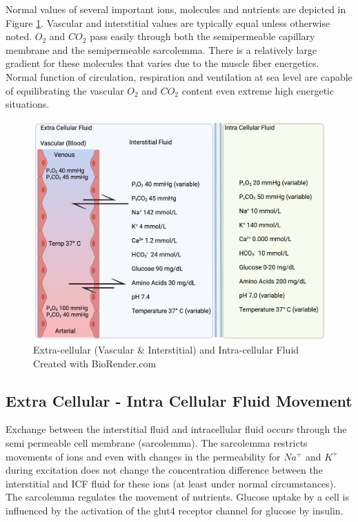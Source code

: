 Normal values of several important ions, molecules and nutrients are depicted in Figure \ref{fig:ecf}. Vascular and interstitial values are typically equal unless otherwise noted. $O_2$ and $CO_2$ pass easily through both the semipermeable capillary membrane and the semipermeable sarcolemma. There is a relatively large gradient for these molecules that varies due to the muscle fiber energetics. Normal function of circulation, respiration and ventilation at sea level are capable of equilibrating the vascular $O_2$ and $CO_2$ content even extreme high energetic situations.

\begin{figure}[!h]
    \centering
    \includegraphics[width=1\linewidth]{./figure/ecf.png}
    \caption{Extra-cellular (Vascular \& Interstitial) and Intra-cellular Fluid \footnotesize{Created with BioRender.com}}
    \label{fig:ecf}
\end{figure}

\subsection{Extra Cellular - Intra Cellular Fluid Movement}

Exchange between the interstitial fluid and intracellular fluid occurs through the semi permeable cell membrane (sarcolemma). The sarcolemma restricts movements of ions and even with changes in the permeability for $Na^+$ and $K^+$ during excitation does not change the concentration difference between the interstitial and ICF fluid for these ions (at least under normal circumstances). The sarcolemma regulates the movement of nutrients.  Glucose uptake by a cell is influenced by the activation of the glut4 receptor channel for glucose by insulin. 


